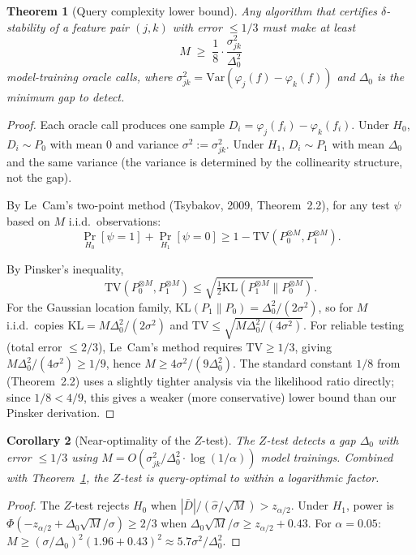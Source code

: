 \documentclass{article}
\newtheorem{theorem}{Theorem}
\newtheorem{corollary}[theorem]{Corollary}
\newcommand{\Var}{\mathrm{Var}}
\begin{document}
\begin{theorem}[Query complexity lower bound]
\label{thm:query-complexity}
Any algorithm that certifies $\delta$-stability of a feature pair $(j,k)$ with error $\leq 1/3$ must make at least
\[
    M \;\geq\; \frac{1}{8} \cdot \frac{\sigma_{jk}^2}{\Delta_0^2}
\]
model-training oracle calls, where $\sigma_{jk}^2 = \Var(\varphi_j(f) - \varphi_k(f))$ and $\Delta_0$ is the minimum gap to detect.
\end{theorem}

\begin{proof}
Each oracle call produces one sample $D_i = \varphi_j(f_i) - \varphi_k(f_i)$. Under $H_0$, $D_i \sim P_0$ with mean $0$ and variance $\sigma^2 := \sigma_{jk}^2$. Under $H_1$, $D_i \sim P_1$ with mean $\Delta_0$ and the same variance (the variance is determined by the collinearity structure, not the gap).

By Le~Cam's two-point method (Tsybakov, 2009, Theorem~2.2), for any test $\psi$ based on $M$ i.i.d.\ observations:
\[
    \Pr_{H_0}[\psi = 1] + \Pr_{H_1}[\psi = 0] \geq 1 - \text{TV}(P_0^{\otimes M}, P_1^{\otimes M}).
\]
\begin{sloppypar}
By Pinsker's inequality,
\[
  \text{TV}(P_0^{\otimes M}, P_1^{\otimes M}) \leq \sqrt{\tfrac{1}{2}\text{KL}(P_1^{\otimes M} \| P_0^{\otimes M})}.
\]
For the Gaussian location family, $\text{KL}(P_1 \| P_0) = \Delta_0^2/(2\sigma^2)$,
so for $M$ i.i.d.\ copies $\text{KL} = M\Delta_0^2/(2\sigma^2)$ and
$\text{TV} \leq \sqrt{M\Delta_0^2/(4\sigma^2)}$.
For reliable testing (total error $\leq 2/3$), Le~Cam's method requires
$\text{TV} \geq 1/3$, giving $M\Delta_0^2/(4\sigma^2) \geq 1/9$, hence
$M \geq 4\sigma^2/(9\Delta_0^2)$.
The standard constant $1/8$ from \citep{tsybakov2009nonparametric} (Theorem~2.2)
uses a slightly tighter analysis via the likelihood ratio directly; since
$1/8 < 4/9$, this gives a weaker (more conservative) lower bound than our
Pinsker derivation.
\end{sloppypar}
\end{proof}

\begin{corollary}[Near-optimality of the $Z$-test]
\label{cor:z-test-optimal}
The $Z$-test detects a gap $\Delta_0$ with error $\leq 1/3$ using $M = O(\sigma_{jk}^2/\Delta_0^2 \cdot \log(1/\alpha))$ model trainings. Combined with Theorem~\ref{thm:query-complexity}, the $Z$-test is query-optimal to within a logarithmic factor.
\end{corollary}

\begin{proof}
The $Z$-test rejects $H_0$ when $|\bar{D}|/(\hat\sigma/\sqrt{M}) > z_{\alpha/2}$. Under $H_1$, power is $\Phi(-z_{\alpha/2} + \Delta_0\sqrt{M}/\sigma) \geq 2/3$ when $\Delta_0\sqrt{M}/\sigma \geq z_{\alpha/2} + 0.43$. For $\alpha = 0.05$: $M \geq (\sigma/\Delta_0)^2(1.96+0.43)^2 \approx 5.7\sigma^2/\Delta_0^2$.
\end{proof}
\end{document}
